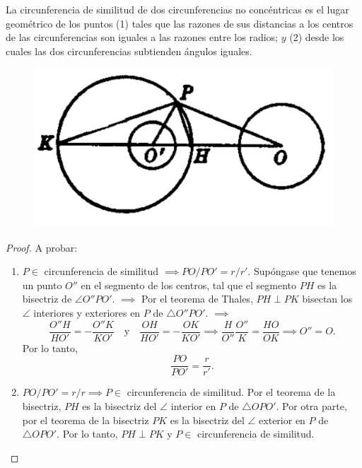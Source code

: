\begin{problema}
	 La circunferencia de similitud de dos circunferencias no concéntricas es el lugar geométrico de los puntos (1) tales que las razones de sus distancias a los centros de las circunferencias son iguales a las razones entre los radios; $y$ (2) desde los cuales las dos circunferencias subtienden ángulos iguales.
	 \begin{figure}[H]
	 	\centering
	 	\includegraphics[scale=0.2]{Images/2}
	 \end{figure}
\end{problema}
\begin{proof}
	A probar: 
	\begin{enumerate}
		\item $P\in$ circunferencia de similitud $\implies PO/PO'=r/r'$. Supóngase que tenemos un punto $O''$ en el segmento de los centros, tal que el segmento $PH$ es la bisectriz de $\angle O''PO'$. $\implies$ Por el teorema de Thales, $PH \perp PK$ bisectan los $\angle$ interiores y exteriores en $P$ de $\triangle O''PO'$. $\implies$ 
		$$\frac{O''H}{HO'}= -\frac{O''K}{KO'}\quad \text{y} \quad \frac{OH}{HO'}=-\frac{OK}{KO'}\implies \frac{H}{O''}\frac{O''}{K}=\frac{HO}{OK}\implies O''=O.$$
		Por lo tanto, $$\frac{PO}{PO'}=\frac{r}{r'}.$$
		\item $PO/PO'=r/r\implies P\in$ circunferencia de similitud.  Por el teorema de la bisectriz,  $PH$ es la bisectriz del $\angle$ interior en $P$ de $\triangle OPO'$. Por otra parte, por el teorema de la bisectriz $PK$ es la bisectriz del $\angle$ exterior en $P$ de $\triangle OPO'$. Por lo tanto, $PH\perp  PK$ y $P\in $ circunferencia de similitud. 
	\end{enumerate}
\end{proof}




